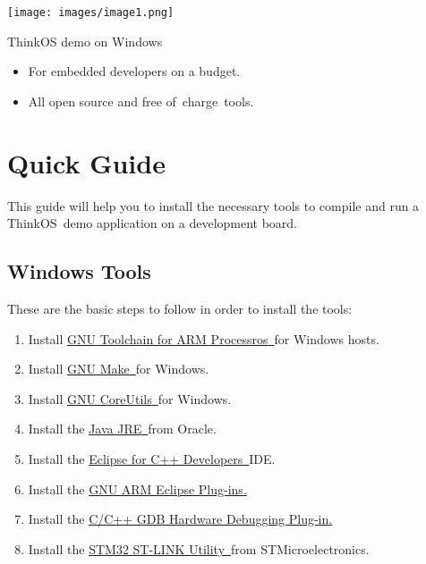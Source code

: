 {\texttt{[image: images/image1.png]}}{~ }

{ThinkOS demo on Windows}

\begin{itemize}
\item
  \hypertarget{h.gjdgxs}{}

  {For embedded developers on a budget.}
\item
  {All open source and free of}{~}{charge}{~}{tools.}
\end{itemize}

\section{\texorpdfstring{{Quick Guide}}{Quick Guide}}\label{quick-guide}

{This guide will help you to install the necessary tools to compile and
run a }{ThinkOS}{~demo application on a development board.}

\subsection{\texorpdfstring{{Windows
Tools}}{Windows Tools}}\label{windows-tools}

{These are the basic steps to follow in order to install the tools: }

\begin{enumerate}
\tightlist
\item
  {Install }{\protect\hyperlink{h.30j0zll}{GNU Toolchain for ARM
  Processros}}{\protect\hyperlink{h.30j0zll}{~}}{for Windows hosts.}
\item
  {Install }{\protect\hyperlink{h.1fob9te}{GNU
  Make}}{\protect\hyperlink{h.1fob9te}{~}}{for Windows.}
\item
  {Install }{\protect\hyperlink{h.3znysh7}{GNU
  CoreUtils}}{\protect\hyperlink{h.3znysh7}{~}}{for Windows.}
\item
  {Install the }{\protect\hyperlink{h.2et92p0}{Java
  JRE}}{\protect\hyperlink{h.2et92p0}{~}}{from Oracle.}
\item
  {Install the }{\protect\hyperlink{h.tyjcwt}{Eclipse for C++
  Developers}}{\protect\hyperlink{h.tyjcwt}{~}}{IDE.}
\item
  {Install the }{\protect\hyperlink{h.3dy6vkm}{GNU ARM Eclipse
  Plug-ins}}{\protect\hyperlink{h.3dy6vkm}{.}}
\item
  {Install the }{\protect\hyperlink{h.1t3h5sf}{C/C++ GDB Hardware
  Debugging Plug-in}}{\protect\hyperlink{h.1t3h5sf}{.}}
\item
  {Install the }{\protect\hyperlink{h.4d34og8}{STM32 ST-LINK
  Utility}}{\protect\hyperlink{h.4d34og8}{~}}{from STMicroelectronics.}
\end{enumerate}

